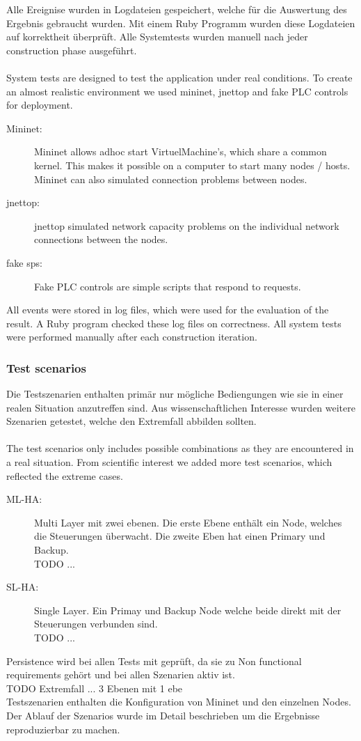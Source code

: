 Alle Ereignise wurden in Logdateien gespeichert, welche für die Auswertung des Ergebnis gebraucht wurden. 
Mit einem Ruby Programm wurden diese Logdateien auf korrektheit überprüft.
Alle Systemtests wurden manuell nach jeder construction phase ausgeführt.\\
\\
System tests are designed to test the application under real conditions. 
To create an almost realistic environment we used mininet, jnettop and fake PLC controls for deployment.
\begin{description}
	\item [Mininet:]
		Mininet allows adhoc start VirtuelMachine's, which share a common kernel.
		This makes it possible on a computer to start many nodes / hosts. 
		Mininet can also simulated connection problems between nodes.
	\item [jnettop:]
		jnettop simulated network capacity problems on the individual network connections between the nodes.
	\item [fake sps:]
		Fake PLC controls are simple scripts that respond to requests.
\end{description}

All events were stored in log files, which were used for the evaluation of the result. 
A Ruby program checked these log files on correctness. All system tests were performed manually 
after each construction iteration.

\subsubsection{Test scenarios}
Die Testszenarien enthalten primär nur mögliche Bediengungen wie sie in einer realen Situation anzutreffen sind. Aus wissenschaftlichen Interesse wurden weitere Szenarien
getestet, welche den Extremfall abbilden sollten.\\
\\
The test scenarios only includes possible combinations as they are encountered in a real situation. From scientific interest
we added more test scenarios, which reflected the extreme cases.
\begin{description}
	\item [ML-HA:]
		Multi Layer mit zwei ebenen. Die erste Ebene enthält ein Node, 
		welches die Steuerungen überwacht. Die zweite Eben hat einen Primary und Backup.
	\\TODO ...
	\item [SL-HA:]
		Single Layer. Ein Primay und Backup Node welche beide direkt mit der Steuerungen verbunden sind.
		\\TODO ...
\end{description}
Persistence wird bei allen Tests mit geprüft, da sie zu Non functional requirements gehört und bei allen Szenarien aktiv ist.
\\TODO Extremfall ... 3 Ebenen mit 1 ebe
\\
Testszenarien enthalten die Konfiguration von Mininet und den einzelnen Nodes. 
Der Ablauf der Szenarios wurde im Detail beschrieben um die Ergebnisse reproduzierbar zu machen.


